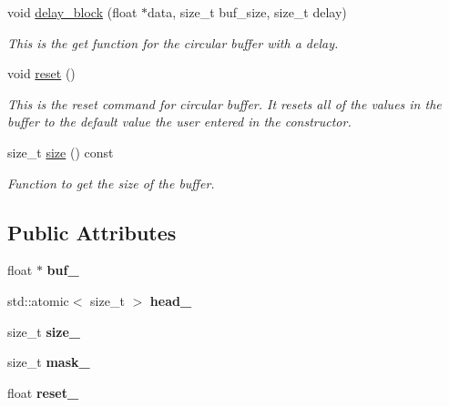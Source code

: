 \begin{DoxyCompactItemize}
void \hyperlink{classcircular__buffer_a39828678a4debfd0ce70196260f62956}{delay\+\_\+block} (float $\ast$data, size\+\_\+t buf\+\_\+size, size\+\_\+t delay)
\begin{DoxyCompactList}\small\item\em This is the get function for the circular buffer with a delay. \end{DoxyCompactList}\item 
\mbox{\label{classcircular__buffer_a36426e279d80a1616fb858582eae3f1f}} 
void \hyperlink{classcircular__buffer_a36426e279d80a1616fb858582eae3f1f}{reset} ()
\begin{DoxyCompactList}\small\item\em This is the reset command for circular buffer. It resets all of the values in the buffer to the default value the user entered in the constructor. \end{DoxyCompactList}\item 
size\+\_\+t \hyperlink{classcircular__buffer_ae8fb2f8eb0275b98b6767d5e3979787a}{size} () const
\begin{DoxyCompactList}\small\item\em Function to get the size of the buffer. \end{DoxyCompactList}\end{DoxyCompactItemize}
\subsection*{Public Attributes}
\begin{DoxyCompactItemize}
\item 
\mbox{\label{classcircular__buffer_a14ef6a352fc8ba6a5f5ba3ef79579b35}} 
float $\ast$ {\bfseries buf\+\_\+}
\item 
\mbox{\label{classcircular__buffer_ae0840d62ae876718d65854e9f3478b6f}} 
std\+::atomic$<$ size\+\_\+t $>$ {\bfseries head\+\_\+}
\item 
\mbox{\label{classcircular__buffer_ac405641287665aceb64d65c99b00abc9}} 
size\+\_\+t {\bfseries size\+\_\+}
\item 
\mbox{\label{classcircular__buffer_a3733cb9af9b280d0277d6337857e3e72}} 
size\+\_\+t {\bfseries mask\+\_\+}
\item 
\mbox{\label{classcircular__buffer_a2ad9096ce4ecd7e86997c3f471e7a10e}} 
float {\bfseries reset\+\_\+}
\end{DoxyCompactItemize}


